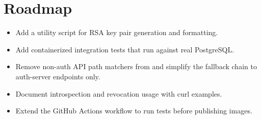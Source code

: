 \section{Roadmap}

\begin{itemize}
  \item Add a  utility script for RSA key pair generation and formatting.
  \item Add containerized integration tests that run against real PostgreSQL.
  \item Remove non-auth API path matchers from  and simplify the fallback chain to auth-server endpoints only.
  \item Document introspection and revocation usage with curl examples.
  \item Extend the GitHub Actions workflow to run tests before publishing images.
\end{itemize}
